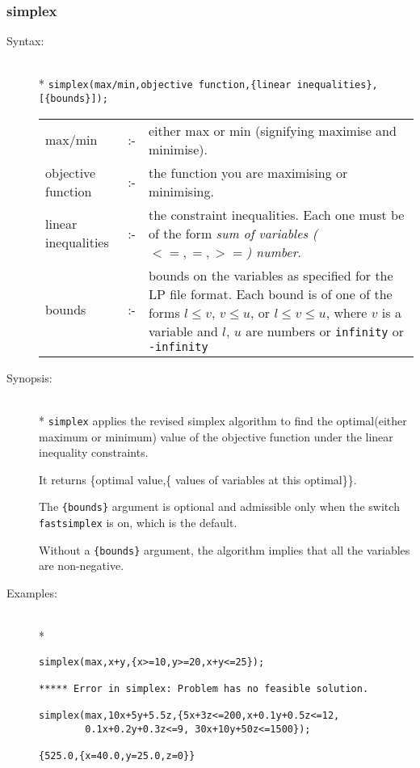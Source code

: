 \subsubsection{simplex}
\label{linalg:simplex}

\begin{description}
\item[Syntax:]\mbox{}\\*
\texttt{simplex(max/min,objective function,\{linear 
inequalities\},[\{bounds\}]);}\\[2mm]
\begin{tabular}{l l p{.63\linewidth}} 
  max/min             & :- & either max or min 
    (signifying maximise and minimise). \\
  objective function  & :- & the function you are maximising or 
  minimising. \\
  linear inequalities & :- & the constraint 
    inequalities. Each one must be of the form 
    \textit{sum of variables ($<=,=,>=$) number}.\\
  bounds & :- & bounds on the variables as
    specified for the LP file format. Each bound is of one of the forms $l\leq
    v$, $v\leq u$, or $l\leq v\leq u$, where $v$ is a variable and $l$, $u$ are
    numbers or \texttt{infinity} or \texttt{-infinity}
\end{tabular}

\item[Synopsis:]\mbox{}\\*
\texttt{simplex} applies the revised simplex algorithm to find the 
optimal(either maximum or minimum) value of the objective function 
under the linear inequality constraints.

It returns \{optimal value,\{ values of variables at this optimal\}\}.

The \texttt{\{bounds\}} argument is optional and admissible only when the switch
\texttt{fastsimplex} is on, which is the default.

Without a \texttt{\{bounds\}} argument, the algorithm implies that all the
variables are non-negative.

\item[Examples:]\mbox{}\\*
\begin{verbatim}
simplex(max,x+y,{x>=10,y>=20,x+y<=25});

***** Error in simplex: Problem has no feasible solution.

simplex(max,10x+5y+5.5z,{5x+3z<=200,x+0.1y+0.5z<=12,
        0.1x+0.2y+0.3z<=9, 30x+10y+50z<=1500});

{525.0,{x=40.0,y=25.0,z=0}}
\end{verbatim}
\end{description}


